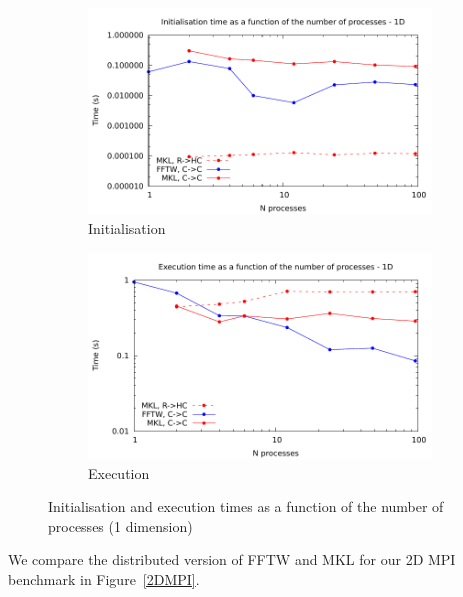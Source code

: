 \documentclass[12pt, a4paper]{article} \setlength{\textheight}{24cm}
\begin{document}
\begin{figure}[H]
  \captionsetup{width=0.8\linewidth}
  \centering
  \begin{subfigure}{.5\textwidth}
    \centering
    \includegraphics[width=.9\linewidth]{graphs/mpi-init-1d.pdf}
    \caption{Initialisation}
    \label{1DMPII}
  \end{subfigure}%
  \begin{subfigure}{.5\textwidth}
    \centering
    \includegraphics[width=.9\linewidth]{graphs/mpi-exec-1d.pdf}
    \caption{Execution}
    \label{1DMPIE}
  \end{subfigure}
  \caption{Initialisation and execution times as a function of the
    number of processes (1 dimension)}
  \label{1DMPI}
\end{figure}


We compare the distributed version of FFTW and MKL for our 2D MPI benchmark in Figure~\ref{2DMPI}. 
\end{document}
